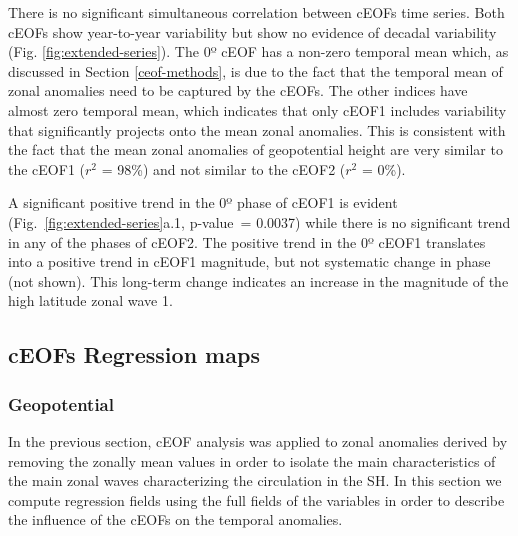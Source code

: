 \documentclass[pdflatex,lineno,sn-basic]{sn-jnl}
\theoremstyle{thmstyleone}%
\theoremstyle{thmstyletwo}%
\theoremstyle{thmstylethree}%
\begin{document}
There is no significant simultaneous correlation between cEOFs time series.
Both cEOFs show year-to-year variability but show no evidence of decadal variability (Fig. \ref{fig:extended-series}).
The 0º cEOF has a non-zero temporal mean which, as discussed in Section \ref{ceof-methods}, is due to the fact that the temporal mean of zonal anomalies need to be captured by the cEOFs.
The other indices have almost zero temporal mean, which indicates that only cEOF1 includes variability that significantly projects onto the mean zonal anomalies.
This is consistent with the fact that the mean zonal anomalies of geopotential height are very similar to the cEOF1 (\(r^2\) = 98\%) and not similar to the cEOF2 (\(r^2\) = 0\%).

A significant positive trend in the 0º phase of cEOF1 is evident (Fig.~\ref{fig:extended-series}a.1, p-value~= 0.0037) while there is no significant trend in any of the phases of cEOF2.
The positive trend in the 0º cEOF1 translates into a positive trend in cEOF1 magnitude, but not systematic change in phase (not shown).
This long-term change indicates an increase in the magnitude of the high latitude zonal wave 1.

\hypertarget{regressions}{%
\subsection{cEOFs Regression maps}\label{regressions}}

\hypertarget{geopotential}{%
\subsubsection{Geopotential}\label{geopotential}}

In the previous section, cEOF analysis was applied to zonal anomalies derived by removing the zonally mean values in order to isolate the main characteristics of the main zonal waves characterizing the circulation in the SH.
In this section we compute regression fields using the full fields of the variables in order to describe the influence of the cEOFs on the temporal anomalies.
\end{document}
